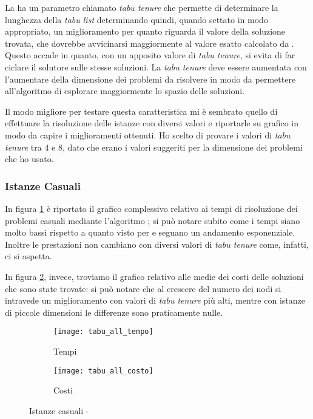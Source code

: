 La \tabu ha un parametro chiamato \emph{tabu tenure} che permette di determinare la lunghezza della \emph{tabu list} determinando quindi, quando settato in modo appropriato, un miglioramento per quanto riguarda il valore della soluzione trovata, che dovrebbe avvicinarsi maggiormente al valore esatto calcolato da .
Questo accade in quanto, con un apposito valore di \emph{tabu tenure}, si evita di far ciclare il solutore sulle stesse soluzioni.
La \emph{tabu tenure} deve essere aumentata con l'aumentare della dimensione dei problemi da risolvere in modo da permettere all'algoritmo di esplorare maggiormente lo spazio delle soluzioni.

Il modo migliore per testare questa caratteristica mi è sembrato quello di effettuare la risoluzione delle istanze con diversi valori e riportarle su grafico in modo da capire i miglioramenti ottenuti.
Ho scelto di provare i valori di \emph{tabu tenure} tra $4$ e $8$, dato che erano i valori suggeriti per la dimensione dei problemi che ho usato.

\subsubsection{Istanze Casuali}
In figura \ref{fig:all tempi tabu} è riportato il grafico complessivo relativo ai tempi di risoluzione dei problemi casuali mediante l'algoritmo \tabu; si può notare subito come i tempi siano molto bassi rispetto a quanto visto per  e seguano un andamento esponenziale.
Inoltre le prestazioni non cambiano con diversi valori di \emph{tabu tenure} come, infatti, ci si aspetta.

In figura \ref{fig:all costi tabu}, invece, troviamo il grafico relativo alle medie dei costi delle soluzioni che sono state trovate: si può notare che al crescere del numero dei nodi si intravede un miglioramento con valori di \emph{tabu tenure} più alti, mentre con istanze di piccole dimensioni le differenze sono praticamente nulle.

\begin{figure}[H]
	\centering
	\begin{subfigure}[b]{.45\textwidth}
			\texttt{[image: tabu\_all\_tempo]}
			\caption{Tempi}
			\label{fig:all tempi tabu}
	\end{subfigure}
	\quad
	\begin{subfigure}[b]{.45\textwidth}
			\texttt{[image: tabu\_all\_costo]}
			\caption{Costi}
			\label{fig:all costi tabu}
	\end{subfigure}
	\caption{Istanze casuali - \tabu}
	\label{fig:all tempi costi tabu}
\end{figure}

